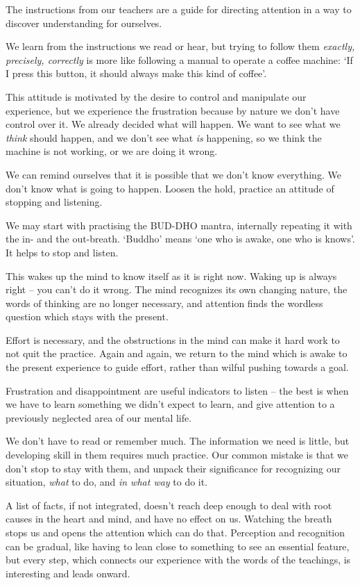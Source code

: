 The instructions from our teachers are a guide for directing attention
in a way to discover understanding for ourselves.

We learn from the instructions we read or hear, but trying to follow
them \emph{exactly, precisely, correctly} is more like following a
manual to operate a coffee machine: `If I press this button, it should
always make this kind of coffee'.

This attitude is motivated by the desire to control and manipulate our
experience, but we experience the frustration because by nature we don't
have control over it. We already decided what will happen. We want to
see what we \emph{think} should happen, and we don't see what \emph{is}
happening, so we think the machine is not working, or we are doing it
wrong.

We can remind ourselves that it is possible that we don't know
everything. We don't know what is going to happen. Loosen the hold,
practice an attitude of stopping and listening.


We may start with practising the BUD-DHO mantra, internally repeating it
with the in- and the out-breath. `Buddho' means `one who is awake, one
who is knows'. It helps to stop and listen.

This wakes up the mind to know itself as it is right now. Waking up is
always right -- you can't do it wrong. The mind recognizes its own
changing nature, the words of thinking are no longer necessary, and
attention finds the wordless question which stays with the present.

Effort is necessary, and the obstructions in the mind can make it hard
work to not quit the practice. Again and again, we return to the mind
which is awake to the present experience to guide effort, rather than
wilful pushing towards a goal.

Frustration and disappointment are useful indicators to listen -- the
best is when we have to learn something we didn't expect to learn, and
give attention to a previously neglected area of our mental life.

We don't have to read or remember much. The information we need is
little, but developing skill in them requires much practice. Our common
mistake is that we don't stop to stay with them, and unpack their
significance for recognizing our situation, \emph{what} to do, and
\emph{in what way} to do it.

A list of facts, if not integrated, doesn't reach deep enough to deal
with root causes in the heart and mind, and have no effect on us.
Watching the breath stops us and opens the attention which can do that.
Perception and recognition can be gradual, like having to lean close to
something to see an essential feature, but every step, which connects
our experience with the words of the teachings, is interesting and leads
onward.

